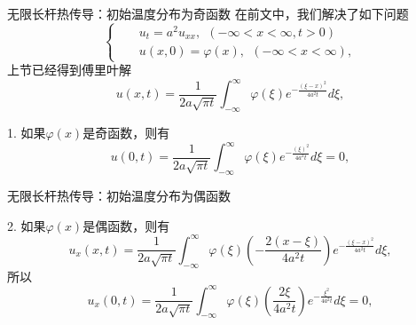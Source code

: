 \documentclass[11pt]{beamer}
\begin{document}
\begin{frame}{无限长杆热传导：初始温度分布为奇函数}
在前文中，我们解决了如下问题
\begin{equation}
\left\{
\begin{aligned}
&& u_t = a^2 u_{xx}, ~~ ( -\infty < x < \infty, t>0) \\
&& u(x,0) = \varphi(x), ~~ ( -\infty <x< \infty ),
\end{aligned}
\right.
\end{equation}
上节已经得到傅里叶解
\begin{equation}
u(x,t) = \frac{1}{2a\sqrt{\pi t}} \int^\infty_{-\infty} \varphi(\xi) e^{ - \frac{(\xi - x)^2}{4a^2 t} } d \xi,
\end{equation}

1. 如果$\varphi(x)$是奇函数，则有
\begin{equation}
u(0,t) = \frac{1}{2a\sqrt{\pi t}} \int^\infty_{-\infty} \varphi(\xi) e^{ - \frac{(\xi)^2}{4a^2 t} } d \xi = 0,
\end{equation}
\end{frame}

\begin{frame}{无限长杆热传导：初始温度分布为偶函数}

2. 如果$\varphi(x)$是偶函数，则有
\begin{equation}
u_x(x,t) = \frac{1}{2a\sqrt{\pi t}} \int^\infty_{-\infty} \varphi(\xi) 
( - \frac{2(x-\xi)}{4a^2 t} )
e^{ - \frac{(\xi - x)^2}{4a^2 t} } d \xi,
\end{equation}
所以
\begin{equation}
u_x(0,t) = \frac{1}{2a\sqrt{\pi t}} \int^\infty_{-\infty} \varphi(\xi) 
( \frac{2\xi}{4a^2 t} )
e^{ - \frac{\xi^2}{4a^2 t} } d \xi = 0,
\end{equation}

\end{frame}
\end{document}
